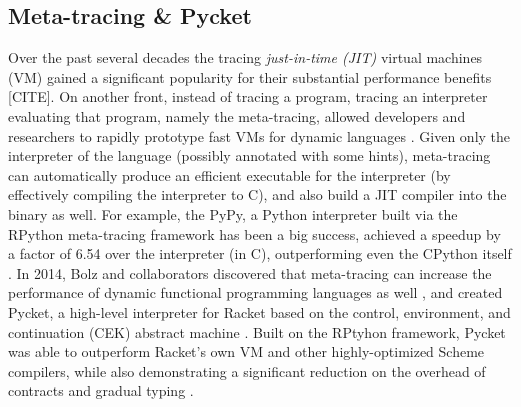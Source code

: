 \subsection{Meta-tracing \& Pycket}
\label{subsec:meta-trace}

Over the past several decades the tracing \emph{just-in-time (JIT)}
virtual machines (VM) gained a significant popularity for their
substantial performance benefits [CITE]. On another front, instead of
tracing a program, tracing an interpreter evaluating that program,
namely the meta-tracing, allowed developers and researchers to rapidly
prototype fast VMs for dynamic languages \cite{bolz09}. Given only the
interpreter of the language (possibly annotated with some hints),
meta-tracing can automatically produce an efficient executable for the
interpreter (by effectively compiling the interpreter to C), and also
build a JIT compiler into the binary as well. For example, the PyPy, a
Python interpreter built via the RPython meta-tracing framework has
been a big success, achieved a speedup by a factor of 6.54 over the
interpreter (in C), outperforming even the CPython itself
\cite{bolz09}. In 2014, Bolz and collaborators discovered that
meta-tracing can increase the performance of dynamic functional
programming languages as well \cite{bolz14-racket}, and created
Pycket, a high-level interpreter for Racket based on the control,
environment, and continuation (CEK) abstract machine
\cite{felleisen87}. Built on the RPtyhon framework, Pycket was able to
outperform Racket's own VM and other highly-optimized Scheme
compilers, while also demonstrating a significant reduction on the
overhead of contracts and gradual typing \cite{pycket15,pycket17}.
